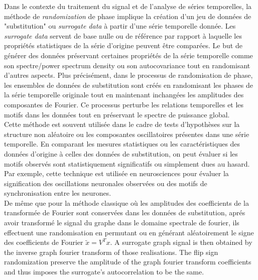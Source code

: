 \documentclass[12pt]{article}
\begin{document}
    Dans le contexte du traitement du signal et de l'analyse de séries temporelles, la méthode de \textit{randomization} de phase implique la création d'un jeu de données de "substitution" ou \textit{surrogate data} à partir d'une série temporelle donnée. Les \textit{surrogate data} servent de base nulle ou de référence par rapport à laquelle les propriétés statistiques de la série d'origine peuvent être comparées. Le but de générer des données préservant certaines propriétés de la série temporelle comme son spectre/power spectrum density ou son autocovariance
    tout en randomisant d'autres aspects. Plus précisément, dans le processus de randomisation de phase, les ensembles de données de substitution sont créés en randomisant les phases de la série temporelle originale tout en maintenant inchangées les amplitudes des composantes de Fourier. Ce processus perturbe les relations temporelles et les motifs dans les données tout en préservant le spectre de puissance global.\\
    Cette méthode est souvent utilisée dans le cadre de tests d'hypothèses sur la structure non aléatoire ou les composantes oscillatoires présentes dans une série temporelle. En comparant les mesures statistiques ou les caractéristiques des données d'origine à celles des données de substitution, on peut évaluer si les motifs observés sont statistiquement significatifs ou simplement dues au hasard. Par exemple, cette technique est utilisée en neurosciences pour 
    évaluer la signification des oscillations neuronales observées ou des motifs de synchronisation entre les neurones.\\

    De même que pour la méthode classique où les amplitudes des coefficients de la transformée de Fourier sont conservées dans les données de substitution, aprés avoir transformé le signal du graphe dans le domaine spectrale de fourier, ils effectuent une randomisation en permutant ou en générant aléatoirement le signe des coefficients de Fourier $\tilde{x} = V^Tx$.
    A surrogate graph signal is then obtained by the inverse graph fourier transform of those realisations. The flip sign randomization preserve the amplitude of the graph fourier transform coefficients and thus imposes the surrogate's autocorrelation to be the same.
\end{document}
